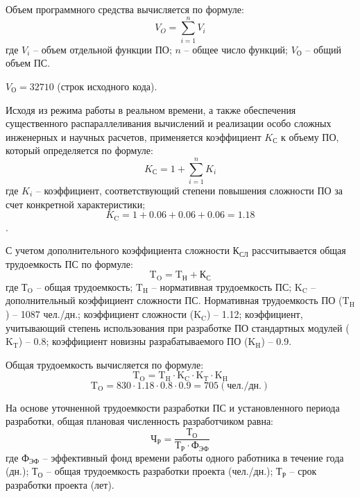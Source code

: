 Объем программного средства вычисляется по формуле:
\begin{equation}
\label{formula:economics:cost:f_vo}
V_{O} = \sum_{i=1}^n V_{i}
\end{equation}
где $V_{i}$ -- объем отдельной функции ПО; $n$ -- общее число функций; $V_{\text{О}}$ -- общий объем ПС.

$V_{\text{О}} = 32710$ (строк исходного кода).

Исходя из режима работы в реальном времени, а также обеспечения существенного распараллеливания вычислений и реализации особо сложных инженерных и научных расчетов, применяется коэффициент $K_{\text{С}}$ к объему ПО, который определяется по формуле:
\begin{equation}
\label{formula:economics:cost:f_kc}
K_{\text{С}} = 1 + \sum_{i=1}^n K_{i}
\end{equation}
где $K_{i}$ -- коэффициент, соответствующий степени повышения сложности ПО за счет конкретной характеристики;
$$K_{\text{C}} = 1 + 0.06 + 0.06 + 0.06 = 1.18$$.

С учетом дополнительного коэффициента сложности ${\text{К}}_{\text{СЛ}}$ рассчитывается общая трудоемкость ПС по формуле:
\begin{equation}
\label{formula:economics:cost:f_kcl}
{\text{T}}_{\text{O}} = {\text{T}}_{\text{Н}} + {\text{К}}_{\text{С}}
\end{equation}
где ${\text{Т}}_{\text{O}}$ -- общая трудоемкость; ${\text{T}}_{\text{H}}$ -- нормативная трудоемкость ПС; ${\text{K}}_{\text{C}}$ -- дополнительный коэффициент сложности ПС. Нормативная трудоемкость ПО (${\text{T}}_{\text{H}}$) -- 1087 чел./дн.; коэффициент сложности (${\text{K}}_{\text{C}}$) -- 1.12; коэффициент, учитывающий степень использования при разработке ПО стандартных модулей (${\text{K}}_{\text{T}}$) -- 0.8; коэффициент новизны разрабатываемого ПО (${\text{K}}_{\text{H}}$) -- 0.9.

Общая трудоемкость вычисляется по формуле:
\begin{equation}
\label{formula:economics:cost:f_to}
{\text{T}}_{\text{O}} = {\text{T}}_{\text{H}} \cdot {\text{K}}_{\text{C}} \cdot {\text{K}}_{\text{T}} \cdot {\text{K}}_{\text{H}}
\end{equation}
$${\text{T}}_{\text{O}} = 830 \cdot 1.18 \cdot 0.8 \cdot 0.9 = 705 (\text{чел./дн.})$$

На основе уточненной трудоемкости разработки ПС и установленного периода разработки, общая плановая численность разработчиком равна:
\begin{equation}
\label{formula:economics:cost:f_chr}
{\text{Ч}}_{\text{Р}} = \frac{ {\text{Т}}_{\text{О}} }{ {\text{Т}}_{\text{Р}} \cdot {\text{Ф}}_{\text{ЭФ}} }
\end{equation}
где ${\text{Ф}}_{\text{ЭФ}}$ -- эффективный фонд времени работы одного работника в течение года (дн.); ${\text{Т}}_{\text{О}}$ -- общая трудоемкость разработки проекта (чел./дн.); ${\text{Т}}_{\text{Р}}$ -- срок разработки проекта (лет).

